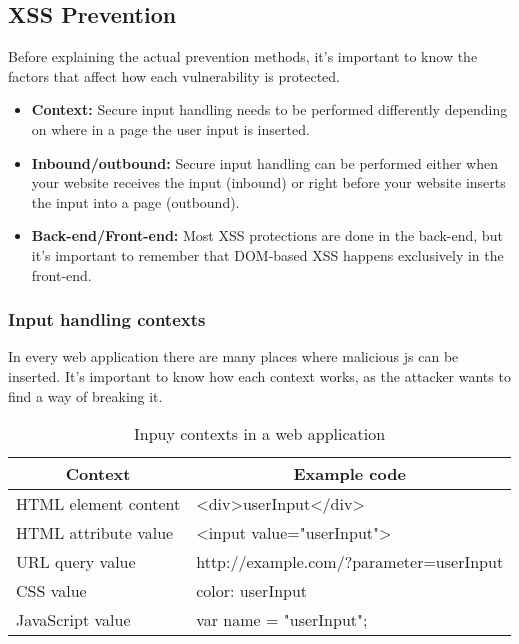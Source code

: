 \subsection{XSS Prevention}
Before explaining the actual prevention methods, it's important to know the factors that affect how each vulnerability is protected.
\begin{itemize}
	\item \textbf{Context:} Secure input handling needs to be performed differently depending on where in a page the user input is inserted.
	\item \textbf{Inbound/outbound:} Secure input handling can be performed either when your website receives the input (inbound) or right before your website inserts the input into a page (outbound).
	\item \textbf{Back-end/Front-end:} Most XSS protections are done in the back-end, but it's important to remember that DOM-based XSS happens exclusively in the front-end.
\end{itemize}

\subsubsection{Input handling contexts}
In every web application there are many places where malicious js can be inserted. It's important to know how each context works, as the attacker wants to find a way of breaking it.

\begin{table}[]
	\centering
	\caption{Inpuy contexts in a web application}
	\label{my-label}
	\begin{tabular}{|l|l|}
		\hline
		\multicolumn{1}{|c|}{\textbf{Context}} & \multicolumn{1}{c|}{\textbf{Example code}}                         \\ \hline
		HTML element content                   & \textless{}div\textgreater{}userInput\textless{}/div\textgreater{} \\ \hline
		HTML attribute value                   & \textless{}input value="userInput"\textgreater{}                   \\ \hline
		URL query value                        & http://example.com/?parameter=userInput                            \\ \hline
		CSS value                              & color: userInput                                                   \\ \hline
		JavaScript value                       & var name = "userInput";                                            \\ \hline
	\end{tabular}
\end{table}

